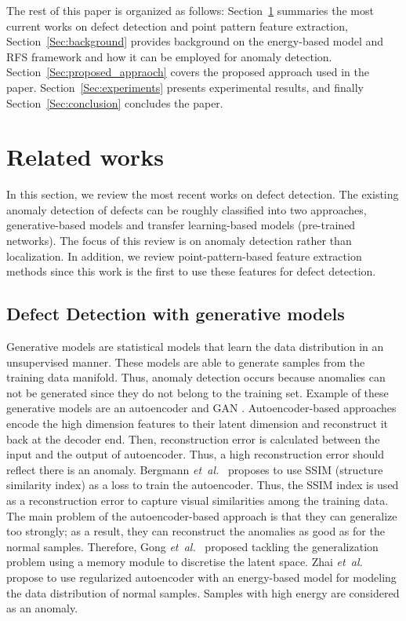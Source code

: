\documentclass[journal]{IEEEtran}
\newcommand \andothers {\textit{et~al.}}
\begin{document}
The rest of this paper is organized as follows: Section~\ref{Sec:relate_dworks} summaries the most current works on defect detection and point pattern feature extraction,  Section~\ref{Sec:background} provides background on the energy-based model and RFS framework and how it can be employed for anomaly detection. Section~\ref{Sec:proposed_appraoch} covers the proposed approach used in the paper. Section~\ref{Sec:experiments} presents experimental results, and finally Section~\ref{Sec:conclusion} concludes the paper.

\section{Related works}
\label{Sec:relate_dworks}
In this section, we review the most recent works on defect detection. The existing anomaly detection of defects can be roughly classified into two approaches, generative-based models and transfer learning-based models (pre-trained networks). The focus of this review is on anomaly detection rather than localization. In addition, we review point-pattern-based feature extraction methods since this work is the first to use these features for defect detection.


\subsection{Defect Detection with generative models}
Generative models \cite{goodfellow2014generative,kingma2013auto,rudolph2019structuring,lecun1989generalization} are statistical models that learn the data distribution in an unsupervised manner. These models are able to generate samples from the training data manifold. Thus, anomaly detection occurs because anomalies can not be generated since they do not belong to the training set. Example of these generative models are an autoencoder\cite{kingma2013auto} and GAN \cite{goodfellow2014generative}.
Autoencoder-based approaches encode the high dimension features to their  latent dimension and reconstruct it back at the decoder end. Then, reconstruction error is calculated between the input and the output of autoencoder. Thus, a high reconstruction error should reflect there is an anomaly. Bergmann \andothers~\cite{bergmann2019mvtec} proposes to use SSIM (structure similarity index) as a loss to train the autoencoder. Thus, the SSIM index is used as a reconstruction error to capture visual similarities among the training data.  The main problem of the autoencoder-based approach is that they can generalize too strongly; as a result, they can reconstruct the anomalies as good as for the normal samples. Therefore, Gong \andothers~\cite{chen2005simultaneous} proposed tackling the generalization problem using a memory module to discretise the latent space. Zhai \andothers~\cite{zhai2016deep} propose to use regularized autoencoder with an energy-based model for modeling the data distribution of normal samples. Samples with high energy are considered as an anomaly.
\end{document}
